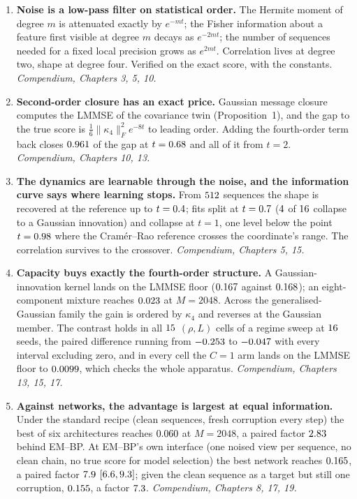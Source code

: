 \documentclass[11pt,a4paper]{article}
\newcommand{\hi}[1]{\textbf{#1}}
\newcommand{\comp}[1]{{\small\textit{Compendium, #1.}}}
\begin{document}
\begin{enumerate}
\item \hi{Noise is a low-pass filter on statistical order.} The Hermite moment of degree $m$ is
attenuated exactly by $e^{-mt}$; the Fisher information about a feature first visible at degree
$m$ decays as $e^{-2mt}$; the number of sequences needed for a fixed local precision grows as
$e^{2mt}$. Correlation lives at degree two, shape at degree four. Verified on the exact score,
with the constants. \comp{Chapters 3, 5, 10}

\item \hi{Second-order closure has an exact price.} Gaussian message closure computes the LMMSE of
the covariance twin (Proposition~1), and the gap to the true score is
$\tfrac16\|\kappa_4\|_F^2e^{-8t}$ to leading order. Adding the fourth-order term back closes
$0.961$ of the gap at $t=0.68$ and all of it
from $t=2$. \comp{Chapters 10, 13}

\item \hi{The dynamics are learnable through the noise, and the information curve says where
learning stops.} From $512$ sequences the shape is recovered at the reference up to
$t=0.4$; fits split at $t=0.7$
($4$ of $16$ collapse to a Gaussian innovation) and
collapse at $t=1$, one level below the point $t=0.98$ where the Cram\'er--Rao
reference crosses the coordinate's range. The correlation survives to the crossover.
\comp{Chapters 5, 15}

\item \hi{Capacity buys exactly the fourth-order structure.} A Gaussian-innovation kernel lands on
the LMMSE floor ($0.167$ against $0.168$); an eight-component mixture reaches
$0.023$ at $M=2048$. Across the generalised-Gaussian family the gain is ordered by
$\kappa_4$ and reverses at the Gaussian member. The contrast holds in all $15$
$(\rho,L)$ cells of a regime sweep at $16$ seeds, the paired difference running from
$-0.253$ to $-0.047$ with every interval excluding zero, and in every cell the
$C=1$ arm lands on the LMMSE floor to $0.0099$, which checks the whole apparatus.
\comp{Chapters 13, 15, 17}

\item \hi{Against networks, the advantage is largest at equal information.} Under the standard
recipe (clean sequences, fresh corruption every step) the best of six architectures reaches
$0.060$ at $M=2048$, a paired factor $2.83$ behind EM--BP. At EM--BP's own
interface (one noised view per sequence, no clean chain, no true score for model selection) the
best network reaches $0.165$, a paired factor $7.9$
$[6.6,9.3]$; given the clean sequence as a target but still one
corruption, $0.155$, a factor $7.3$. \comp{Chapters 8, 17, 19}


\end{enumerate}
\end{document}
